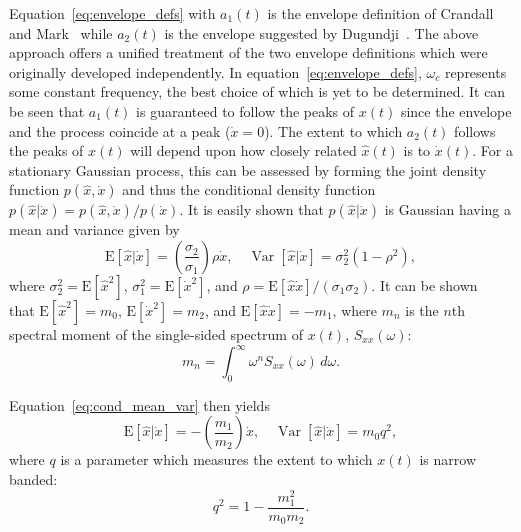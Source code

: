 \documentclass[12pt]{article}
\theoremstyle{plain}
\theoremstyle{definition}
\theoremstyle{remark}
\begin{document}
Equation~\eqref{eq:envelope_defs} with $a_1(t)$ is the envelope definition of Crandall and Mark~\cite{crandall1963} while $a_2(t)$ is the envelope suggested by Dugundji~\cite{dugundji1958}. The above approach offers a unified treatment of the two envelope definitions which were originally developed independently. In equation~\eqref{eq:envelope_defs}, $\omega_c$ represents some constant frequency, the best choice of which is yet to be determined. It can be seen that $a_1(t)$ is guaranteed to follow the peaks of $x(t)$ since the envelope and the process coincide at a peak ($\dot{x}=0$). The extent to which $a_2(t)$ follows the peaks of $x(t)$ will depend upon how closely related $\hat{x}(t)$ is to $\dot{x}(t)$. For a stationary Gaussian process, this can be assessed by forming the joint density function $p(\hat{x}, \dot{x})$ and thus the conditional density function $p(\hat{x} | \dot{x}) = p(\hat{x}, \dot{x}) / p(\dot{x})$. It is easily shown that $p(\hat{x} | \dot{x})$ is Gaussian having a mean and variance given by~\cite{nigam1983}
\begin{equation}
    \mathrm{E}[\hat{x} | \dot{x}] = \left( \frac{\sigma_2}{\sigma_1} \right) \rho \dot{x}, \quad \operatorname{Var}[\hat{x} | \dot{x}] = \sigma_2^2 (1 - \rho^2),
    \label{eq:cond_mean_var}
\end{equation}
where $\sigma_2^2 = \mathrm{E}[\hat{x}^2]$, $\sigma_1^2 = \mathrm{E}[\dot{x}^2]$, and $\rho = \mathrm{E}[\hat{x} \dot{x}] / (\sigma_1 \sigma_2)$. It can be shown~\cite{papoulis1984} that $\mathrm{E}[\hat{x}^2] = m_0$, $\mathrm{E}[\dot{x}^2] = m_2$, and $\mathrm{E}[\hat{x} \dot{x}] = -m_1$, where $m_n$ is the $n$th spectral moment of the single-sided spectrum of $x(t)$, $S_{xx}(\omega)$:
\begin{equation}
    m_n = \int_0^{\infty} \omega^n S_{xx}(\omega) \, d\omega.
    \label{eq:spectral_moments}
\end{equation}

Equation~\eqref{eq:cond_mean_var} then yields
\begin{equation}
    \mathrm{E}[\hat{x} | \dot{x}] = -\left( \frac{m_1}{m_2} \right) \dot{x}, \quad \operatorname{Var}[\hat{x} | \dot{x}] = m_0 q^2,
    \label{eq:cond_mean_var2}
\end{equation}
where $q$ is a parameter which measures the extent to which $x(t)$ is narrow banded:
\begin{equation}
    q^2 = 1 - \frac{m_1^2}{m_0 m_2}.
    \label{eq:q_def}
\end{equation}
\end{document}

